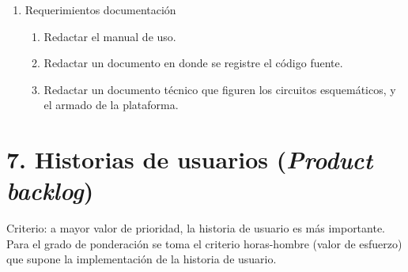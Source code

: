 \documentclass[
11pt, %
codirector, %
]{charter}
\begin{document}
\begin{enumerate}
\vspace{0.3cm}

\item Requerimientos documentación
	\begin{enumerate}
	\item Redactar el manual de uso. 
	\item Redactar un documento en donde se registre el código 
	fuente.
	\item Redactar un documento técnico que figuren los circuitos
	esquemáticos, y el armado de la plataforma.
	\end{enumerate}
\end{enumerate}

\vspace{2cm} 


\section{7. Historias de usuarios (\textit{Product backlog})}
\label{sec:backlog}

Criterio: a mayor valor de prioridad, la historia de usuario es más importante. Para el grado de ponderación se toma el criterio horas-hombre (valor de esfuerzo) que supone la implementación de la historia de usuario.
\end{document}
